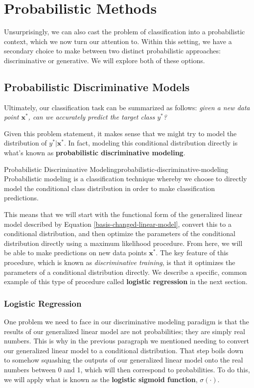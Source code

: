 \section{Probabilistic Methods}
Unsurprisingly, we can also cast the problem of classification into a probabilistic context, which we now turn our attention to. Within this setting, we have a secondary choice to make between two distinct probabilistic approaches: discriminative or generative. We will explore both of these options.

\subsection{Probabilistic Discriminative Models}
Ultimately, our classification task can be summarized as follows: \textit{given a new data point $\textbf{x}^{*}$, can we accurately predict the target class $y^{*}$?}

Given this problem statement, it makes sense that we might try to model the distribution of $y^{*}|\textbf{x}^{*}$. In fact, modeling this conditional distribution directly is what's known as \textbf{probabilistic discriminative modeling}.

\begin{definition}{Probabilistic Discriminative Modeling}{probabilistic-discriminative-modeling}
    Probabilistic modeling is a classification technique whereby we choose to directly model the conditional class distribution in order to make classification predictions.
\end{definition}

This means that we will start with the functional form of the generalized linear model described by Equation \ref{basis-changed-linear-model}, convert this to a conditional distribution, and then optimize the parameters of the conditional distribution directly using a maximum likelihood procedure. From here, we will be able to make predictions on new data points $\textbf{x}^{*}$. The key feature of this procedure, which is known as \textit{discriminative training}, is that it optimizes the parameters of a conditional distribution directly. We describe a specific, common example of this type of procedure called \textbf{logistic regression} in the next section.

\subsubsection{Logistic Regression}
One problem we need to face in our discriminative modeling paradigm is that the results of our generalized linear model are not probabilities; they are simply real numbers. This is why in the previous paragraph we mentioned needing to convert our generalized linear model to a conditional distribution. That step boils down to somehow squashing the outputs of our generalized linear model onto the real numbers between 0 and 1, which will then correspond to probabilities. To do this, we will apply what is known as the \textbf{logistic sigmoid function}, $\sigma(\cdot)$.

